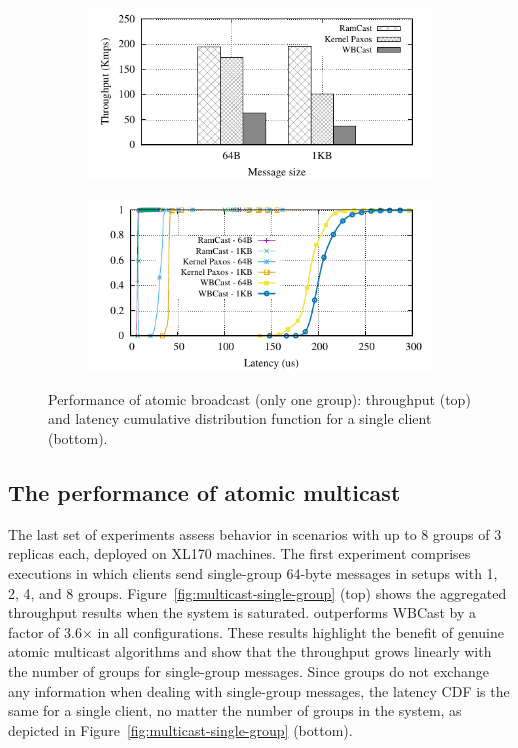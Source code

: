 \begin{figure}[htp!]
  \begin{subfigure}{\columnwidth}
    \advance\leftskip-0.1cm
    \includegraphics[width=0.99\columnwidth]{figures/benchmark/graphs/figure-compare-single-group-throughput}
  \end{subfigure}
  \begin{subfigure}{\columnwidth}
    \centering
    \includegraphics[width=0.95\columnwidth]{figures/benchmark/graphs/figure-compare-single-group-latency-cdf}
  \end{subfigure}
  \caption{Performance of atomic broadcast (only one group): throughput (top) and latency cumulative distribution function for a single client (bottom).}
  \label{fig:broadcast}
\end{figure}


\subsection{The performance of atomic multicast}
\label{sec:evaluation:multicast}

The last set of experiments assess \libname behavior in scenarios with up to 8 groups of 3 replicas each, deployed on XL170 machines.
The first experiment comprises executions in which clients send single-group 64-byte messages in setups with 1, 2, 4, and 8 groups.
Figure~\ref{fig:multicast-single-group} (top) shows the aggregated throughput results when the system is saturated. 
\libname outperforms WBCast by a factor of 3.6$\times$ in all configurations.
These results highlight the benefit of genuine atomic multicast algorithms and show that the throughput grows linearly with the number of groups for single-group messages. 
Since groups do not exchange any information when dealing with single-group messages, the latency CDF is the same for a single client, no matter the number of groups in the system, as depicted in Figure~\ref{fig:multicast-single-group} (bottom).

